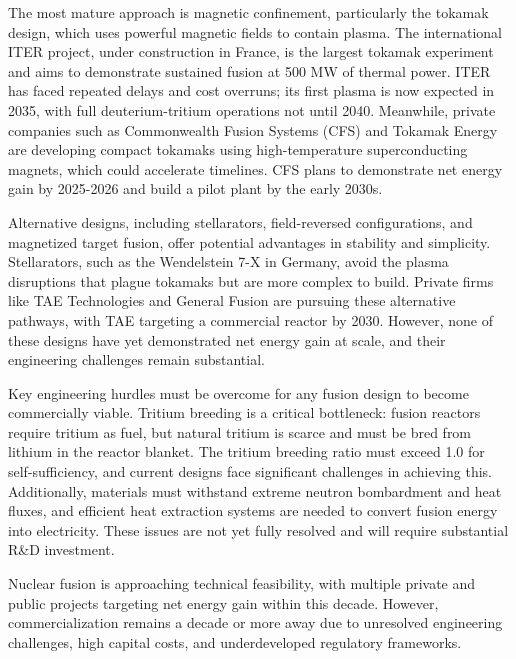 \documentclass[10pt,a4paper]{article}
\begin{document}
{\small The most mature approach is magnetic confinement, particularly the tokamak design, which uses powerful magnetic fields to contain plasma. The international ITER project, under construction in France, is the largest tokamak experiment and aims to demonstrate sustained fusion at 500 MW of thermal power. ITER has faced repeated delays and cost overruns; its first plasma is now expected in 2035, with full deuterium-tritium operations not until 2040. Meanwhile, private companies such as Commonwealth Fusion Systems (CFS) and Tokamak Energy are developing compact tokamaks using high-temperature superconducting magnets, which could accelerate timelines. CFS plans to demonstrate net energy gain by 2025-2026 and build a pilot plant by the early 2030s.}\par
{\small Alternative designs, including stellarators, field-reversed configurations, and magnetized target fusion, offer potential advantages in stability and simplicity. Stellarators, such as the Wendelstein 7-X in Germany, avoid the plasma disruptions that plague tokamaks but are more complex to build. Private firms like TAE Technologies and General Fusion are pursuing these alternative pathways, with TAE targeting a commercial reactor by 2030. However, none of these designs have yet demonstrated net energy gain at scale, and their engineering challenges remain substantial.}\par
{\small Key engineering hurdles must be overcome for any fusion design to become commercially viable. Tritium breeding is a critical bottleneck: fusion reactors require tritium as fuel, but natural tritium is scarce and must be bred from lithium in the reactor blanket. The tritium breeding ratio must exceed 1.0 for self-sufficiency, and current designs face significant challenges in achieving this. Additionally, materials must withstand extreme neutron bombardment and heat fluxes, and efficient heat extraction systems are needed to convert fusion energy into electricity. These issues are not yet fully resolved and will require substantial R\&D investment.}\par
{\small Nuclear fusion is approaching technical feasibility, with multiple private and public projects targeting net energy gain within this decade. However, commercialization remains a decade or more away due to unresolved engineering challenges, high capital costs, and underdeveloped regulatory frameworks.}\par
{}\par\vspace{1pt}
\end{document}
